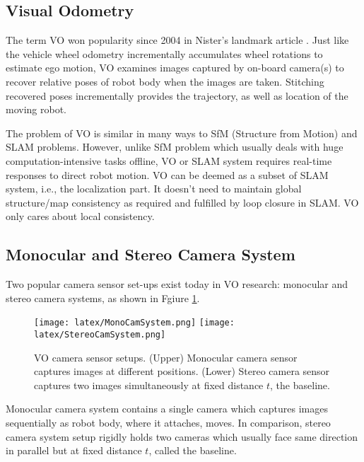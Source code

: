 \documentclass[10pt,twocolumn,letterpaper]{article}
\begin{document}
\subsection{Visual Odometry}

The term VO won popularity since 2004 in Nister's landmark article \cite{Nistr2004VisualO}. Just like the vehicle wheel odometry incrementally accumulates wheel rotations to estimate ego motion, VO examines images captured by on-board camera(s) to recover relative poses of robot body when the images are taken. Stitching recovered poses incrementally provides the trajectory, as well as location of the moving robot. 

The problem of VO is similar in many ways to SfM (Structure from Motion) and SLAM problems. However, unlike SfM problem which usually deals with huge computation-intensive tasks offline, VO or SLAM system requires real-time responses to direct robot motion. VO can be deemed as a subset of SLAM system, i.e., the localization part. It doesn't need to maintain global structure/map consistency as required and fulfilled by loop closure in SLAM. VO only cares about local consistency.

\subsection{Monocular and Stereo Camera System}

Two popular camera sensor set-ups exist today in VO research: monocular and stereo camera systems, as shown in Fgiure \ref{fig:VOSensorSetup}.


\begin{figure}[t]
\centering
\texttt{[image: latex/MonoCamSystem.png]} 
\texttt{[image: latex/StereoCamSystem.png]}

\caption{VO camera sensor setups. (Upper) Monocular camera sensor captures images at different positions. (Lower) Stereo camera sensor captures two images simultaneously at fixed distance $t$, the baseline.}
\label{fig:VOSensorSetup}
\end{figure}
 
Monocular camera system contains a single camera which captures images sequentially as robot body, where it attaches, moves. In comparison, stereo camera system setup rigidly holds two cameras which usually face same direction in parallel but at fixed distance $t$, called the baseline. 
\end{document}

